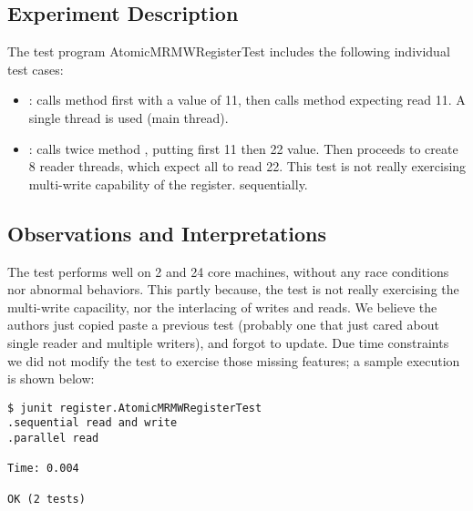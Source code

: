 \subsection{Experiment Description}
The test program AtomicMRMWRegisterTest includes the following individual
test cases: 

\begin{itemize}
  \item {}: calls  method first with a value
    of 11, then calls  method expecting read 11. A single
    thread is used (main thread).
  \item {}: calls twice method , putting first
    11 then 22 value. Then proceeds to create 8 reader threads, which
    expect all to read 22. This test is not really exercising
    multi-write capability of the register.
    sequentially.
\end{itemize}

\subsection{Observations and Interpretations}
The test performs well on 2 and 24 core machines, without any race
conditions nor abnormal behaviors. This partly because, the test is
not really exercising the multi-write capacility, nor the interlacing
of writes and reads. We believe the authors just copied paste a
previous test (probably one that just cared about single reader and
multiple writers), and forgot to update. Due time constraints we did
not modify the test to exercise those missing features; a sample
execution is shown below: 

\begin{verbatim}
$ junit register.AtomicMRMWRegisterTest
.sequential read and write
.parallel read

Time: 0.004

OK (2 tests)
\end{verbatim}
\hfill
